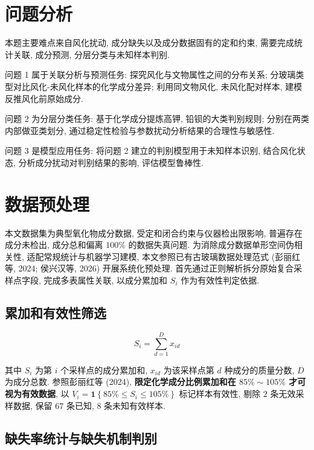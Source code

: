 \documentclass{ctexart}
\begin{document}
\section{问题分析}

本题主要难点来自风化扰动, 成分缺失以及成分数据固有的定和约束, 需要完成统计关联, 成分预测, 分层分类与未知样本判别.

问题 1 属于关联分析与预测任务: 探究风化与文物属性之间的分布关系; 分玻璃类型对比风化-未风化样本的化学成分差异; 利用同文物风化, 未风化配对样本, 建模反推风化前原始成分.

问题 2 为分层分类任务: 基于化学成分提炼高钾, 铅钡的大类判别规则; 分别在两类内部做亚类划分, 通过稳定性检验与参数扰动分析结果的合理性与敏感性.

问题 3 是模型应用任务: 将问题 2 建立的判别模型用于未知样本识别, 结合风化状态, 分析成分扰动对判别结果的影响, 评估模型鲁棒性.

\section{数据预处理}

本文数据集为典型氧化物成分数据, 受定和闭合约束与仪器检出限影响, 普遍存在成分未检出, 成分总和偏离 $100\%$ 的数据失真问题. 为消除成分数据单形空间伪相关性, 适配常规统计与机器学习建模, 本文参照已有古玻璃数据处理范式 (彭丽红等, 2024; 侯兴汉等, 2026) \cite{penglihong2024,houxinghan2026}开展系统化预处理. 首先通过正则解析拆分原始复合采样点字段, 完成多表属性关联, 以成分累加和 $S_i$ 作为有效性判定依据.

\subsection{累加和有效性筛选}

\begin{equation*}
S_{i}=\sum_{d=1}^{D}x_{id}
\end{equation*}

其中 $S_i$ 为第 $i$ 个采样点的成分累加和, $x_{id}$ 为该采样点第 $d$ 种成分的质量分数, $D$ 为成分总数. 参照彭丽红等 (2024), \textbf{限定化学成分比例累加和在 $85\%\sim105\%$ 才可视为有效数据}, 以 $V_{i}=\mathbf{1}\left\{85\%\le{S}_{i}\le105\%\right\}$ 标记样本有效性, 剔除 $2$ 条无效采样数据, 保留 $67$ 条已知, $8$ 条未知有效样本.

\subsection{缺失率统计与缺失机制判别}
\end{document}
